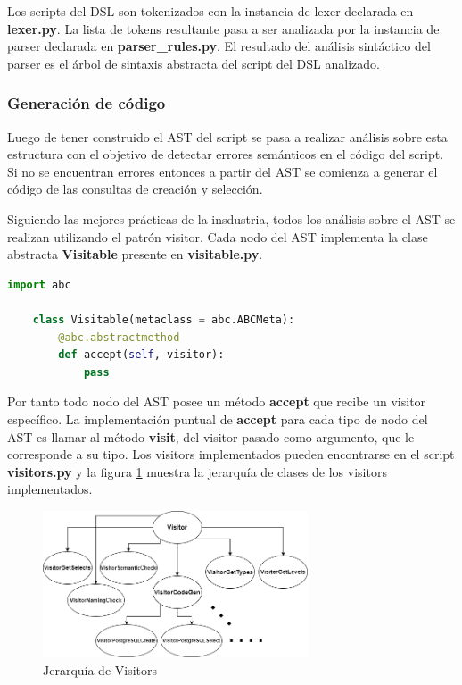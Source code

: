 Los scripts del DSL son tokenizados con la instancia de lexer declarada en \textbf{lexer.py}. La lista de tokens 
resultante pasa a ser analizada por la instancia de parser declarada en \textbf{parser\_rules.py}. El resultado 
del an\'alisis sint\'actico del parser es el \'arbol de sintaxis abstracta del script del DSL analizado.


\subsubsection{Generaci\'on de c\'odigo}

Luego de tener construido el AST del script se pasa a realizar an\'alisis sobre esta estructura con 
el objetivo de detectar errores sem\'anticos en el c\'odigo del script. Si no se encuentran errores 
entonces a partir del AST se comienza a generar el c\'odigo de las consultas de creaci\'on y selecci\'on.

Siguiendo las mejores pr\'acticas de la insdustria, todos los an\'alisis sobre el AST se realizan 
utilizando el patr\'on visitor\cite{buttner2004digging}. Cada nodo del AST implementa la clase abstracta 
\textbf{Visitable} presente en \textbf{visitable.py}. 

\begin{lstlisting}[label={code:visitable}, caption={Clase abstracta Visitable}, language={python}]
    import abc

    class Visitable(metaclass = abc.ABCMeta):
        @abc.abstractmethod
        def accept(self, visitor):
            pass
\end{lstlisting}

Por tanto todo nodo del AST posee un m\'etodo \textbf{accept} que recibe un visitor espec\'ifico. La implementaci\'on 
puntual de \textbf{accept} para cada tipo de nodo del AST es llamar al m\'etodo \textbf{visit}, del visitor pasado como argumento, 
que le corresponde a su tipo. Los visitors implementados pueden encontrarse en el script \textbf{visitors.py} y la 
figura \ref{fig:visitors} muestra la jerarqu\'ia de clases de los visitors implementados.

\begin{figure}[htb]
    \centering
    \includegraphics[width=0.7\textwidth]{Graphics/visitorfixed.drawio.png}
    \caption{Jerarqu\'ia de Visitors}
    \label{fig:visitors}
\end{figure}

